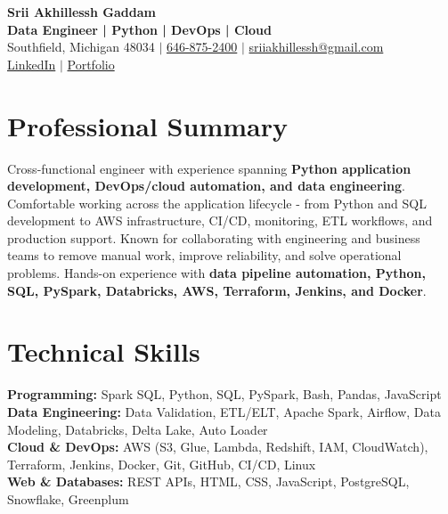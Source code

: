 \documentclass[letterpaper,10pt]{article}
\begin{document}
\fontsize{9.35pt}{10.45pt}\selectfont

\begin{center}
    {\LARGE \textbf{Srii Akhillessh Gaddam}} \\[-1pt]
    \textbf{Data Engineer | Python | DevOps | Cloud} \\[2pt]
    Southfield, Michigan 48034 $|$
    \href{tel:6468752400}{646-875-2400} $|$
    \href{mailto:sriiakhillessh@gmail.com}{sriiakhillessh@gmail.com} \\[1pt]
    \href{https://www.linkedin.com/in/srii-akhiilessh-gaddam-b48668191/}{LinkedIn} $|$
    \href{https://sriiakhillesshg.github.io/portfolio/}{Portfolio}
\end{center}
\vspace{-8pt}

\section{Professional Summary}
\small{Cross-functional engineer with experience spanning \textbf{Python application development, DevOps/cloud automation, and data engineering}. Comfortable working across the application lifecycle - from Python and SQL development to AWS infrastructure, CI/CD, monitoring, ETL workflows, and production support. Known for collaborating with engineering and business teams to remove manual work, improve reliability, and solve operational problems. Hands-on experience with \textbf{data pipeline automation, Python, SQL, PySpark, Databricks, AWS, Terraform, Jenkins, and Docker}.}

\section{Technical Skills}
\small{
\textbf{Programming:} Spark SQL, Python, SQL, PySpark, Bash, Pandas, JavaScript \\
\textbf{Data Engineering:} Data Validation, ETL/ELT, Apache Spark, Airflow, Data Modeling, Databricks, Delta Lake, Auto Loader \\
\textbf{Cloud \& DevOps:} AWS (S3, Glue, Lambda, Redshift, IAM, CloudWatch), Terraform, Jenkins, Docker, Git, GitHub, CI/CD, Linux \\
\textbf{Web \& Databases:} REST APIs, HTML, CSS, JavaScript, PostgreSQL, Snowflake, Greenplum
}

\end{document}

